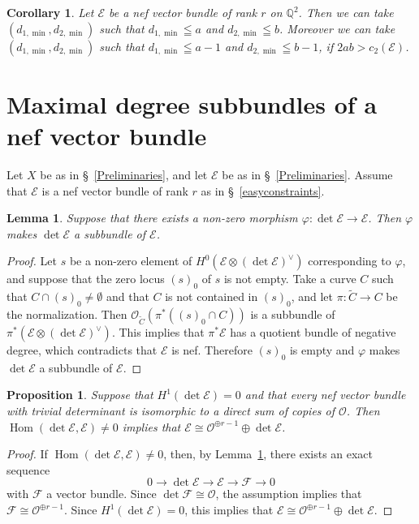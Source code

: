 \documentclass[a4paper,12pt]{amsart}
\newtheorem{prop}[thm]{Proposition}%
\newtheorem{lemma}[thm]{Lemma}%
\newtheorem{cor}[thm]{Corollary}%
\DeclareMathOperator{\Hom}{Hom}
\begin{document}
\begin{cor}\label{quadricResol}
Let $\mathcal{E}$ be a nef vector bundle of rank $r$ on $\mathbb{Q}^2$.
Then we can take 
$(d_{1,\min},d_{2,\min})$ such that 
$d_{1,\min}\leqq a$ and $d_{2,\min}\leqq b$.
Moreover we can take 
$(d_{1,\min},d_{2,\min})$ such that 
$d_{1,\min}\leqq a-1$ and $d_{2,\min}\leqq b-1$,
if $2ab>c_2(\mathcal{E})$.
\end{cor}



\section{Maximal degree subbundles of a nef vector bundle
}
Let $X$ be as in \S~\ref{Preliminaries},
and let $\mathcal{E}$
be as in \S~\ref{Preliminaries}.
Assume that $\mathcal{E}$ is a nef vector bundle of rank $r$ as in \S~\ref{easyconstraints}.

\begin{lemma}\label{detsub}
Suppose that there exists a non-zero morphism $\varphi:\det\mathcal{E}\to \mathcal{E}$. 
Then $\varphi$ makes $\det\mathcal{E}$ a subbundle of $\mathcal{E}$.
\end{lemma}
\begin{proof}
Let $s$ be a non-zero element of $H^0(\mathcal{E}\otimes (\det\mathcal{E})^{\vee})$ corresponding to $\varphi$,
and suppose that the zero locus $(s)_0$ of $s$ is not empty.
Take a curve $C$ such that $C\cap (s)_0\neq \emptyset$
and that $C$ is not contained in $(s)_0$,
and let $\pi:\tilde{C}\to C$ be the normalization.
Then $\mathcal{O}_{\tilde{C}}(\pi^*((s)_0\cap C))$ is a subbundle of 
$
\pi^*(\mathcal{E}\otimes (\det\mathcal{E})^{\vee})$.
This implies that $\pi^*\mathcal{E}$ has a quotient bundle of negative degree,
which contradicts that $\mathcal{E}$ is nef.
Therefore $(s)_0$ is empty and $\varphi$ makes $\det\mathcal{E}$ a subbundle of $\mathcal{E}$.
\end{proof}

\begin{prop}\label{dsubExist}
Suppose 
that $H^1(\det\mathcal{E})=0$
and 
that every nef vector bundle 
with 
trivial determinant 
is isomorphic to a direct sum of copies of $\mathcal{O}$.
Then $\Hom(\det\mathcal{E},\mathcal{E})\neq 0$ implies that $\mathcal{E}\cong \mathcal{O}^{\oplus r-1}\oplus\det\mathcal{E}$.
\end{prop}
\begin{proof}
If $\Hom(\det\mathcal{E},\mathcal{E})\neq 0$, 
then, by Lemma~\ref{detsub}, there exists an exact sequence
\[0\to \det\mathcal{E}\to \mathcal{E}\to \mathcal{F}\to 0\]
with $\mathcal{F}$ a vector bundle.
Since $\det\mathcal{F}\cong \mathcal{O}$, the assumption implies that
$\mathcal{F}\cong \mathcal{O}^{\oplus r-1}$.
Since $H^1(\det\mathcal{E})=0$, this implies that 
$\mathcal{E}\cong \mathcal{O}^{\oplus r-1}\oplus\det\mathcal{E}$.
\end{proof}
\end{document}
